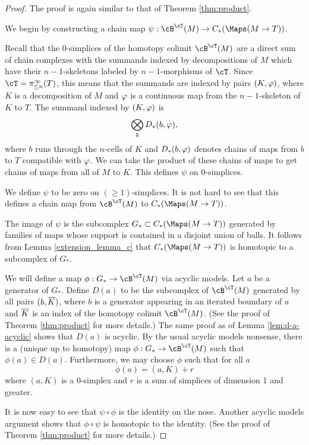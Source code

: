 \begin{proof}
The proof is again similar to that of Theorem \ref{thm:product}.

We begin by constructing a chain map $\psi: \cB^\cT(M) \to C_*(\Maps(M\to T))$.

Recall that 
the 0-simplices of the homotopy colimit $\cB^\cT(M)$ 
are a direct sum of chain complexes with the summands indexed by
decompositions of $M$ which have their $n{-}1$-skeletons labeled by $n{-}1$-morphisms
of $\cT$.
Since $\cT = \pi^\infty_{\leq n}(T)$, this means that the summands are indexed by pairs
$(K, \varphi)$, where $K$ is a decomposition of $M$ and $\varphi$ is a continuous
map from the $n{-}1$-skeleton of $K$ to $T$.
The summand indexed by $(K, \varphi)$ is
\[
	\bigotimes_b D_*(b, \varphi),
\]
where $b$ runs through the $n$-cells of $K$ and $D_*(b, \varphi)$ denotes
chains of maps from $b$ to $T$ compatible with $\varphi$.
We can take the product of these chains of maps to get chains of maps from
all of $M$ to $K$.
This defines $\psi$ on 0-simplices.

We define $\psi$ to be zero on $(\ge1)$-simplices.
It is not hard to see that this defines a chain map from 
$\cB^\cT(M)$ to $C_*(\Maps(M\to T))$.

The image of $\psi$ is the subcomplex $G_*\sub C_*(\Maps(M\to T))$ generated by 
families of maps whose support is contained in a disjoint union of balls.
It follows from Lemma \ref{extension_lemma_c} 
that $C_*(\Maps(M\to T))$ is homotopic to a subcomplex of $G_*$.

We will define a map $\phi:G_*\to \cB^\cT(M)$ via acyclic models.
Let $a$ be a generator of $G_*$.
Define $D(a)$ to be the subcomplex of $\cB^\cT(M)$ generated by all 
pairs $(b, \overline{K})$, where $b$ is a generator appearing in an iterated boundary of $a$
and $\overline{K}$ is an index of the homotopy colimit $\cB^\cT(M)$.
(See the proof of Theorem \ref{thm:product} for more details.)
The same proof as of Lemma \ref{lem:d-a-acyclic} shows that $D(a)$ is acyclic.
By the usual acyclic models nonsense, there is a (unique up to homotopy)
map $\phi:G_*\to \cB^\cT(M)$ such that $\phi(a)\in D(a)$.
Furthermore, we may choose $\phi$ such that for all $a$ 
\[
	\phi(a) = (a, K) + r
\]
where $(a, K)$ is a 0-simplex and $r$ is a sum of simplices of dimension 1 and greater.

It is now easy to see that $\psi\circ\phi$ is the identity on the nose.
Another acyclic models argument shows that $\phi\circ\psi$ is homotopic to the identity.
(See the proof of Theorem \ref{thm:product} for more details.)
\end{proof}